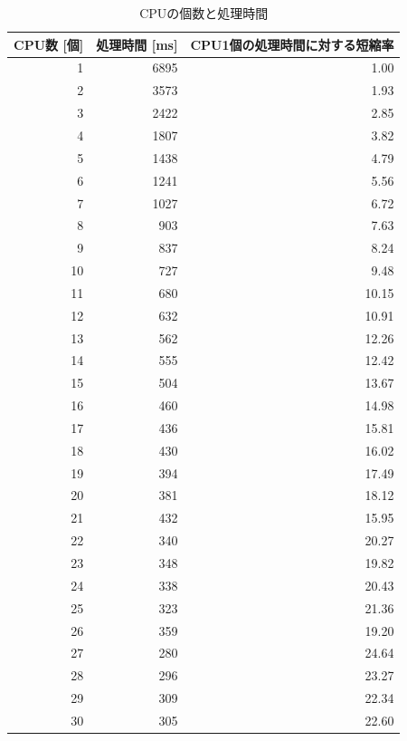 \documentclass[a4j,titlepage]{jsarticle}
\newcommand{\chuo}[1]{\multicolumn{1}{|c|}{#1}}
\begin{document}
\begin{table}[htbp]
  \centering
  \caption{CPUの個数と処理時間}
  \label{tb:kadai3}

  \begin{tabular}{|r|r|r|}
    \hline
    \chuo{CPU数 [個]} & \chuo{処理時間 [ms]} & \chuo{CPU1個の処理時間に対する短縮率} \\ \hline \hline
    1 & 6895 & 1.00 \\ \hline
    2 & 3573 & 1.93 \\ \hline
    3 & 2422 & 2.85 \\ \hline
    4 & 1807 & 3.82 \\ \hline
    5 & 1438 & 4.79 \\ \hline
    6 & 1241 & 5.56 \\ \hline
    7 & 1027 & 6.72 \\ \hline
    8 & 903 & 7.63 \\ \hline
    9 & 837 & 8.24 \\ \hline
    10 & 727 & 9.48 \\ \hline
    11 & 680 & 10.15 \\ \hline
    12 & 632 & 10.91 \\ \hline
    13 & 562 & 12.26 \\ \hline
    14 & 555 & 12.42 \\ \hline
    15 & 504 & 13.67 \\ \hline
    16 & 460 & 14.98 \\ \hline
    17 & 436 & 15.81 \\ \hline
    18 & 430 & 16.02 \\ \hline
    19 & 394 & 17.49 \\ \hline
    20 & 381 & 18.12 \\ \hline
    21 & 432 & 15.95 \\ \hline
    22 & 340 & 20.27 \\ \hline
    23 & 348 & 19.82 \\ \hline
    24 & 338 & 20.43 \\ \hline
    25 & 323 & 21.36 \\ \hline
    26 & 359 & 19.20 \\ \hline
    27 & 280 & 24.64 \\ \hline
    28 & 296 & 23.27 \\ \hline
    29 & 309 & 22.34 \\ \hline
    30 & 305 & 22.60 \\ \hline
  \end{tabular}
\end{table}
\end{document}
